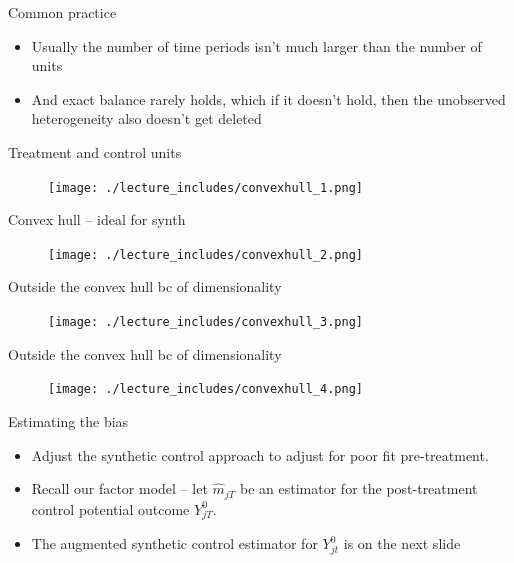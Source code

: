 \documentclass{beamer}
\begin{document}
\begin{frame}{Common practice}

\begin{itemize}
\item Usually the number of time periods isn't much larger than the number of units
\item And exact balance rarely holds, which if it doesn't hold, then the unobserved heterogeneity also doesn't get deleted
\end{itemize}

\end{frame}


\begin{frame}{Treatment and control units}

	\begin{figure}
	\texttt{[image: ./lecture\_includes/convexhull\_1.png]}
	\end{figure}

\end{frame}

\begin{frame}{Convex hull -- ideal for synth}

	\begin{figure}
	\texttt{[image: ./lecture\_includes/convexhull\_2.png]}
	\end{figure}

\end{frame}

\begin{frame}{Outside the convex hull bc of dimensionality}

	\begin{figure}
	\texttt{[image: ./lecture\_includes/convexhull\_3.png]}
	\end{figure}

\end{frame}

\begin{frame}{Outside the convex hull bc of dimensionality}

	\begin{figure}
	\texttt{[image: ./lecture\_includes/convexhull\_4.png]}
	\end{figure}

\end{frame}


\begin{frame}{Estimating the bias}

\begin{itemize}
\item Adjust the synthetic control approach to adjust for poor fit pre-treatment.
\item Recall our factor model -- let $\widehat{m}_{jT}$ be an estimator for the post-treatment control potential outcome $Y_{jT}^0$.
\item The augmented synthetic control estimator for $Y_{jt}^0$ is on the next slide
\end{itemize}


\end{frame}
\end{document}
